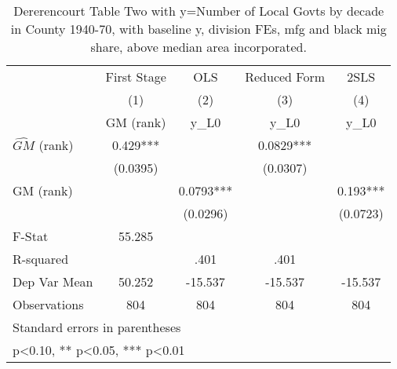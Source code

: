 \begin{table}[htbp]\centering
\def\sym#1{\ifmmode^{#1}\else\(^{#1}\)\fi}
\caption{Dererencourt Table Two with y=Number of Local Govts by decade in County 1940-70, with baseline y, division FEs, mfg and black mig share, above median area incorporated.}
\begin{tabular}{l*{4}{c}}
\toprule
                    & First Stage   &         OLS   &Reduced Form   &        2SLS   \\
                    &\multicolumn{1}{c}{(1)}&\multicolumn{1}{c}{(2)}&\multicolumn{1}{c}{(3)}&\multicolumn{1}{c}{(4)}\\
                    &\multicolumn{1}{c}{GM  (rank)}&\multicolumn{1}{c}{y\_L0}&\multicolumn{1}{c}{y\_L0}&\multicolumn{1}{c}{y\_L0}\\
\midrule
$\hat{GM}$ (rank)   &       0.429***&               &      0.0829***&               \\
                    &    (0.0395)   &               &    (0.0307)   &               \\
\addlinespace
GM  (rank)          &               &      0.0793***&               &       0.193***\\
                    &               &    (0.0296)   &               &    (0.0723)   \\
\midrule
F-Stat              &      55.285   &               &               &               \\
R-squared           &               &        .401   &        .401   &               \\
Dep Var Mean        &      50.252   &     -15.537   &     -15.537   &     -15.537   \\
Observations        &         804   &         804   &         804   &         804   \\
\bottomrule
\multicolumn{5}{l}{\footnotesize Standard errors in parentheses}\\
\multicolumn{5}{l}{\footnotesize * p<0.10, ** p<0.05, *** p<0.01}\\
\end{tabular}
\end{table}

